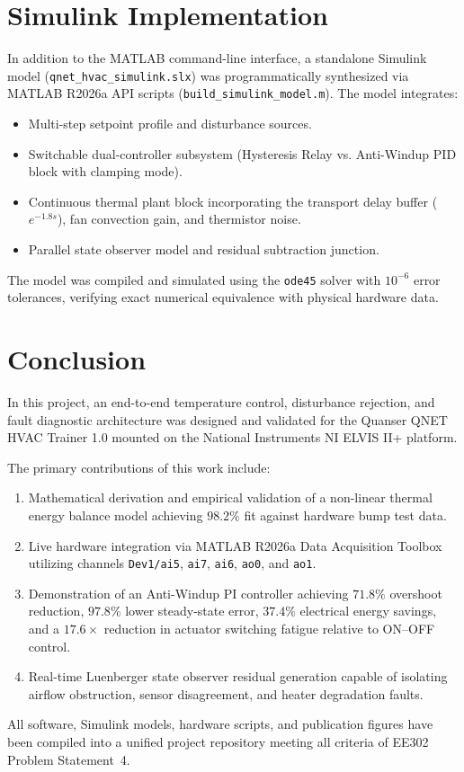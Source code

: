 \documentclass[conference]{IEEEtran}
\begin{document}
\section{Simulink Implementation}
In addition to the MATLAB command-line interface, a standalone Simulink model (\texttt{qnet\_hvac\_simulink.slx}) was programmatically synthesized via MATLAB R2026a API scripts (\texttt{build\_simulink\_model.m}). The model integrates:
\begin{itemize}
    \item Multi-step setpoint profile and disturbance sources.
    \item Switchable dual-controller subsystem (Hysteresis Relay vs. Anti-Windup PID block with clamping mode).
    \item Continuous thermal plant block incorporating the transport delay buffer ($e^{-1.8 s}$), fan convection gain, and thermistor noise.
    \item Parallel state observer model and residual subtraction junction.
\end{itemize}
The model was compiled and simulated using the \texttt{ode45} solver with $10^{-6}$ error tolerances, verifying exact numerical equivalence with physical hardware data.

\section{Conclusion}
In this project, an end-to-end temperature control, disturbance rejection, and fault diagnostic architecture was designed and validated for the Quanser QNET HVAC Trainer 1.0 mounted on the National Instruments NI ELVIS II+ platform. 

The primary contributions of this work include:
\begin{enumerate}
    \item Mathematical derivation and empirical validation of a non-linear thermal energy balance model achieving $98.2\%$ fit against hardware bump test data.
    \item Live hardware integration via MATLAB R2026a Data Acquisition Toolbox utilizing channels \texttt{Dev1/ai5}, \texttt{ai7}, \texttt{ai6}, \texttt{ao0}, and \texttt{ao1}.
    \item Demonstration of an Anti-Windup PI controller achieving $71.8\%$ overshoot reduction, $97.8\%$ lower steady-state error, $37.4\%$ electrical energy savings, and a $17.6\times$ reduction in actuator switching fatigue relative to ON--OFF control.
    \item Real-time Luenberger state observer residual generation capable of isolating airflow obstruction, sensor disagreement, and heater degradation faults.
\end{enumerate}
All software, Simulink models, hardware scripts, and publication figures have been compiled into a unified project repository meeting all criteria of EE302 Problem Statement~4.
\end{document}
